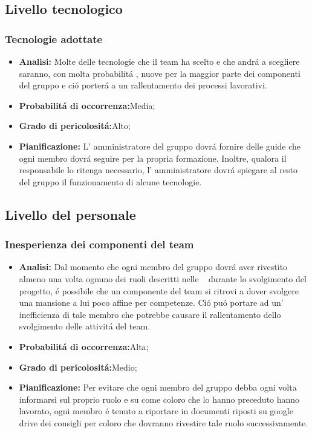 \subsection{Livello tecnologico}
\subsubsection{Tecnologie adottate}
	\begin{itemize}
	\item \textbf{Analisi: }Molte delle tecnologie che il team \gruppo ha scelto e che andr\'a a scegliere saranno, con molta probabilit\'a , nuove per la maggior parte dei componenti del gruppo e ci\'o porter\'a a un rallentamento dei processi lavorativi.
	\item \textbf{Probabilit\'a di occorrenza:}Media;
	\item \textbf{Grado di pericolosit\'a:}Alto;
	\item \textbf{Pianificazione: }L' amministratore del gruppo dovr\'a fornire delle guide che ogni membro dovr\'a seguire per la propria formazione. Inoltre, qualora il responsabile lo ritenga necessario, l' amministratore dovr\'a spiegare al resto del gruppo il funzionamento di alcune tecnologie.
	\end{itemize}
\subsection{Livello del personale}
\subsubsection{Inesperienza dei componenti del team}
	\begin{itemize}
	\item \textbf{Analisi: }Dal momento che ogni membro del gruppo dovr\'a aver rivestito almeno una volta  ognuno dei ruoli descritti nelle \infoNDP~ durante lo svolgimento del progetto, \'e possibile che un componente del team si ritrovi a dover svolgere una mansione a lui poco affine per competenze. Ci\'o pu\'o portare ad un' inefficienza di tale membro che potrebbe causare il rallentamento dello svolgimento delle attivit\'a del team.
	\item \textbf{Probabilit\'a di occorrenza:}Alta;
	\item \textbf{Grado di pericolosit\'a:}Medio;
	\item \textbf{Pianificazione: }Per evitare che ogni membro del gruppo debba ogni volta informarsi sul proprio ruolo e su come coloro che lo hanno preceduto hanno lavorato, ogni membro \'e  tenuto a riportare in documenti riposti su google drive dei consigli per coloro che dovranno rivestire tale ruolo successivamente.
	\end{itemize}
